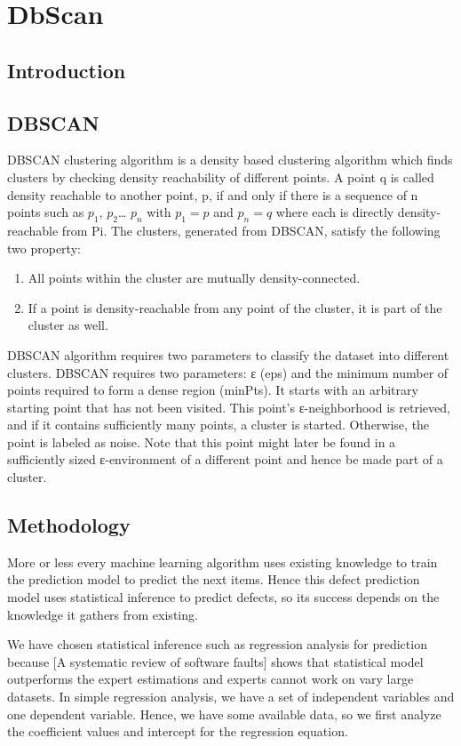 \documentclass[12pt]{report}
\begin{document}
\chapter{ DbScan}
\section{Introduction}

\section{DBSCAN}
 
DBSCAN clustering algorithm is a density based clustering algorithm which finds clusters by checking density reachability of different points. A point q is called density reachable to another point, p, if and only if there is a sequence of n points such as $p_{1}$, $p_{2}$… $p_{n}$ with $p_{1}=p$ and $p_{n}=q$ where each   is directly density-reachable from Pi. The clusters, generated from DBSCAN, satisfy the following two property:
\begin{enumerate}
	\item {All points within the cluster are mutually density-connected.}
	\item {If a point is density-reachable from any point of the cluster, it is part of the cluster as well.}
\end{enumerate}
	
DBSCAN algorithm requires two parameters to classify the dataset into different clusters. DBSCAN requires two parameters: ε (eps) and the minimum number of points required to form a dense region (minPts). It starts with an arbitrary starting point that has not been visited. This point's ε-neighborhood is retrieved, and if it contains sufficiently many points, a cluster is started. Otherwise, the point is labeled as noise. Note that this point might later be found in a sufficiently sized ε-environment of a different point and hence be made part of a cluster.

\section{Methodology}
More or less every machine learning algorithm uses existing knowledge to train the prediction model to predict the next items. Hence this defect prediction model uses statistical inference to predict defects, so its success depends on the knowledge it gathers from existing. 

We have chosen statistical inference such as regression analysis for prediction because [A systematic review of software faults] shows that statistical model outperforms the expert estimations and experts cannot work on vary large datasets. In simple regression analysis, we have a set of independent variables and one dependent variable. Hence, we have some available data, so we first analyze the coefficient values and intercept for the regression equation.
\end{document}
